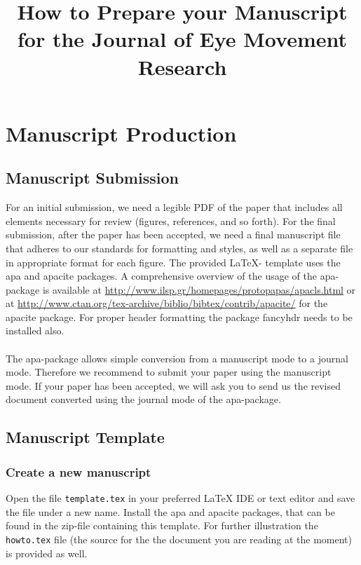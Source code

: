 \documentclass[jou,a4paper,notxfonts]{apa}
\title{How to Prepare your Manuscript for the
Journal of Eye Movement Research}
\begin{document}
\maketitle

\thispagestyle{plain}

\section{Manuscript Production} 
\subsection{Manuscript Submission}
For an initial submission, we need a legible PDF of the paper that includes all elements necessary for review (figures, references, and so forth). For the final submission, after the paper has been accepted, we need a final manuscript file that adheres to our standards for formatting and styles, as well as a separate file in appropriate format for each figure. The provided \LaTeX{}- template uses the apa and apacite packages. A comprehensive overview of the usage of the apa-package 
is available at \url{http://www.ilsp.gr/homepages/protopapas/apacls.html} or at \url{http://www.ctan.org/tex-archive/biblio/bibtex/contrib/apacite/} for the apacite package. For proper header formatting the package fancyhdr needs to be installed also.
\paragraph{}
The apa-package allows simple conversion from a manuscript mode to a journal mode. Therefore we recommend to submit your paper using the manuscript mode. If your paper has been accepted, we will ask you to send us the revised document converted using the journal mode of the apa-package. 
\subsection{Manuscript Template}
\subsubsection{Create a new manuscript}Open the file \texttt{template.tex} in your preferred \LaTeX{} IDE or text editor
and save the file under a new name. Install the apa and apacite packages, that can be found in the zip-file containing this template.
For further illustration the \texttt{howto.tex} file (the source for the the document you are reading at the moment) is provided as well.
\end{document}
